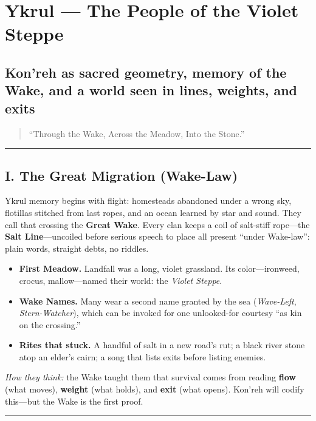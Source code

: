 \documentclass[11pt,letterpaper]{article}
\begin{document}

\section{Ykrul --- The People of the Violet Steppe}

\subsection*{Kon'reh as sacred geometry, memory of the Wake, and a world seen in lines, weights, and exits}

\begin{quote}
``Through the Wake, Across the Meadow, Into the Stone.''
\end{quote}

\medskip\hrule\medskip

\subsection{I. The Great Migration (Wake-Law)}

Ykrul memory begins with flight: homesteads abandoned under a wrong sky, flotillas stitched from last ropes, and an ocean learned by star and sound. They call that crossing the \textbf{Great Wake}. Every clan keeps a coil of salt-stiff rope---the \textbf{Salt Line}---uncoiled before serious speech to place all present ``under Wake-law'': plain words, straight debts, no riddles.

\begin{itemize}[leftmargin=*]
  \item \textbf{First Meadow.} Landfall was a long, violet grassland. Its color---ironweed, crocus, mallow---named their world: the \emph{Violet Steppe}.
  \item \textbf{Wake Names.} Many wear a second name granted by the sea (\emph{Wave-Left}, \emph{Stern-Watcher}), which can be invoked for one unlooked-for courtesy ``as kin on the crossing.''
  \item \textbf{Rites that stuck.} A handful of salt in a new road's rut; a black river stone atop an elder's cairn; a song that lists exits before listing enemies.
\end{itemize}

\emph{How they think:} the Wake taught them that survival comes from reading \textbf{flow} (what moves), \textbf{weight} (what holds), and \textbf{exit} (what opens). Kon'reh will codify this---but the Wake is the first proof.

\medskip\hrule\medskip
\end{document}
